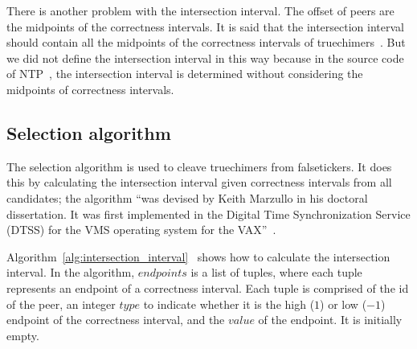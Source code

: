 There is another problem with the intersection interval. The offset of peers are
the midpoints of the correctness intervals. It is said that the intersection
interval should contain all the midpoints of the correctness intervals of
truechimers~\cite{redbook}. But we did not define the intersection interval in
this way because in the source code of NTP~\cite{source_code}, the
intersection interval is determined without considering the midpoints of
correctness intervals.

\subsection{Selection algorithm}%
\label{sub:selection_algorithm}
The selection algorithm is used to cleave truechimers from falsetickers. It
does this by calculating the intersection interval given correctness intervals
from all candidates; the algorithm ``was devised by Keith Marzullo in his
doctoral dissertation.  It was first implemented in the Digital Time
Synchronization Service (DTSS) for the VMS operating system for the
VAX\null''~\cite{clock_selection}.

Algorithm~\ref{alg:intersection_interval}~\cite{source_code} shows how to
calculate the intersection interval.  In the algorithm, $endpoints$ is a list
of tuples, where each tuple represents an endpoint of a correctness interval.
Each tuple is comprised of the id of the peer, an integer $type$ to indicate
whether it is the high ($1$) or low ($-1$) endpoint of the correctness
interval, and the $value$ of the endpoint. It is initially empty.

